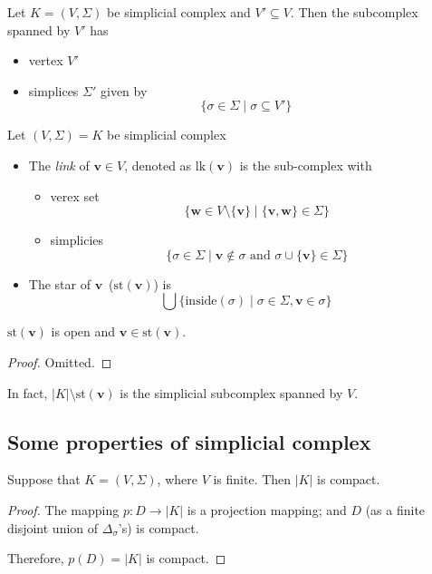 \begin{definition}
Let $K=(V,\Sigma)$ be simplicial complex and $V'\subseteq V$.
Then the subcomplex spanned by $V'$ has
\begin{itemize}
\item
vertex $V'$
\item
simplices $\Sigma'$ given by
\[
\{\sigma\in\Sigma\mid\sigma\subseteq V'\}
\]
\end{itemize}
\end{definition}

\begin{definition}
Let $(V,\Sigma)=K$ be simplicial complex
\begin{itemize}
\item
The \emph{link} of $\bm v\in V$, denoted as $\text{lk}(\bm v)$ is the sub-complex with
\begin{itemize}
\item
verex set
\[
\{\bm w\in V\setminus\{\bm v\}\mid \{\bm v,\bm w\}\in\Sigma\}
\]
\item
simplicies
\[
\{\sigma\in\Sigma\mid\bm v\notin\sigma\text{ and }\sigma\cup\{\bm v\}\in\Sigma\}
\]
\end{itemize}
\item
The star of $\bm v$~($\text{st}(\bm v)$) is
\[
\bigcup\{\text{inside}(\sigma)\mid \sigma\in\Sigma,\bm v\in\sigma\}
\]
\end{itemize}
\end{definition}

\begin{proposition}
$\text{st}(\bm v)$ is open and $\bm v\in\text{st}(\bm v)$.
\end{proposition}
\begin{proof}
Omitted.
\end{proof}
In fact, $|K|\setminus\text{st}(\bm v)$ is the simplicial subcomplex spanned by $V$.

\subsection{Some properties of simplicial complex}

\begin{proposition}
Suppose that $K=(V,\Sigma)$, where $V$ is finite.
Then $|K|$ is compact.
\end{proposition}
\begin{proof}
The mapping $p:D\to|K|$ is a projection mapping; and 
$D$ (as a finite disjoint union of $\Delta_\sigma$'s) is compact.

Therefore, $p(D)=|K|$ is compact.
\end{proof}

